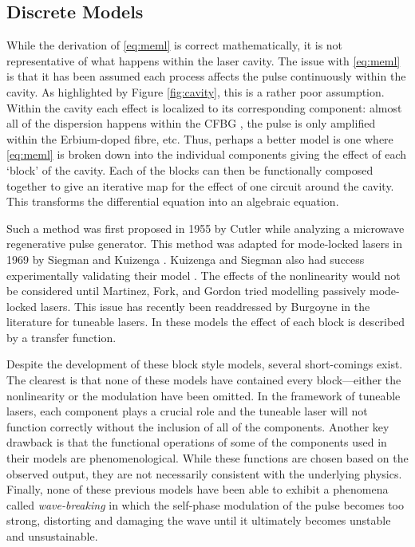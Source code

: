 \documentclass[10pt,twocolumn,a4paper]{article}
\begin{document}
\subsection{Discrete Models}
While the derivation of \eqref{eq:meml} is correct mathematically, it is not representative of what happens within the laser cavity. The issue with \eqref{eq:meml} is that it has been assumed each process affects the pulse continuously within the cavity. As highlighted by Figure \ref{fig:cavity}, this is a rather poor assumption. Within the cavity each effect is localized to its corresponding component: almost all of the dispersion happens within the CFBG \cite{agrawal2002}, the pulse is only amplified within the Erbium-doped fibre, etc. Thus, perhaps a better model is one where \eqref{eq:meml} is broken down into the individual components giving the effect of each `block' of the cavity. Each of the blocks can then be functionally composed together to give an iterative map for the effect of one circuit around the cavity. This transforms the differential equation into an algebraic equation.

Such a method was first proposed in 1955 by Cutler \cite{cutler} while analyzing a microwave regenerative pulse generator. This method was adapted for mode-locked lasers in 1969 by Siegman and Kuizenga \cite{kuizenga1970a, siegman}. Kuizenga and Siegman also had success experimentally validating their model \cite{kuizenga1970b, kuizenga1970}. The effects of the nonlinearity would not be considered until Martinez, Fork, and Gordon \cite{martinez1984, martinez1985} tried modelling passively mode-locked lasers. This issue has recently been readdressed by Burgoyne \cite{burgoyne2014} in the literature for tuneable lasers. In these models the effect of each block is described by a transfer function.

Despite the development of these block style models, several short-comings exist. The clearest is that none of these models have contained every block---either the nonlinearity or the modulation have been omitted. In the framework of tuneable lasers, each component plays a crucial role and the tuneable laser will not function correctly without the inclusion of all of the components. Another key drawback is that the functional operations of some of the components used in their models are phenomenological. While these functions are chosen based on the observed output, they are not necessarily consistent with the underlying physics. Finally, none of these previous models have been able to exhibit a phenomena called \emph{wave-breaking} in which the self-phase modulation of the pulse becomes too strong, distorting and damaging the wave until it ultimately becomes unstable and unsustainable.
\end{document}
